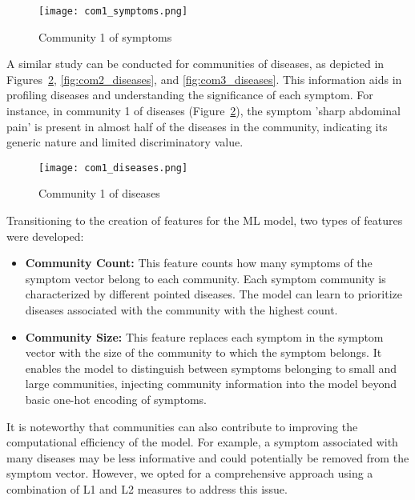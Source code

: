 \begin{figure}[H]
    \centering
    \texttt{[image: com1\_symptoms.png]}
    \caption{Community 1 of symptoms}
    \label{fig:com1_symptoms}
\end{figure}

A similar study can be conducted for communities of diseases, as depicted in Figures~\ref{fig:com1_diseases}, 
\ref{fig:com2_diseases}, and \ref{fig:com3_diseases}. This information aids in profiling diseases and understanding 
the significance of each symptom. For instance, in community 1 of diseases (Figure~\ref{fig:com1_diseases}), 
the symptom 'sharp abdominal pain' is present in almost half of the diseases in the community, indicating its 
generic nature and limited discriminatory value.

\begin{figure}[H]
    \centering
    \texttt{[image: com1\_diseases.png]}
    \caption{Community 1 of diseases}
    \label{fig:com1_diseases}
\end{figure}

Transitioning to the creation of features for the ML model, two types of features were developed:

\begin{itemize}
    \item \textbf{Community Count:} This feature counts how many symptoms of the symptom vector belong to each community. 
    Each symptom community is characterized by different pointed diseases. The model can learn to prioritize 
    diseases associated with the community with the highest count.
    
    \item \textbf{Community Size:} This feature replaces each symptom in the symptom vector with the size of the 
    community to which the symptom belongs. It enables the model to distinguish between symptoms belonging to small and 
    large communities, injecting community information into the model beyond basic one-hot encoding of symptoms.
\end{itemize}

It is noteworthy that communities can also contribute to improving the computational efficiency of the model. 
For example, a symptom associated with many diseases may be less informative and could potentially be removed from the 
symptom vector. However, we opted for a comprehensive approach using a combination of L1 and L2 measures to address this issue.


